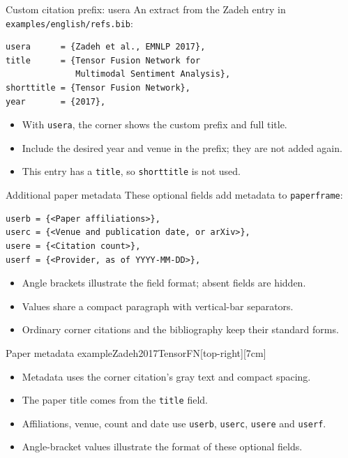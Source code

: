\begin{frame}[fragile]{Custom citation prefix: usera}
  An extract from the Zadeh entry in \texttt{examples/english/refs.bib}:
  \begin{verbatim}
usera      = {Zadeh et al., EMNLP 2017},
title      = {Tensor Fusion Network for
              Multimodal Sentiment Analysis},
shorttitle = {Tensor Fusion Network},
year       = {2017},
  \end{verbatim}
  \begin{itemize}
    \item With \texttt{usera}, the corner shows the custom prefix and full title.
    \item Include the desired year and venue in the prefix; they are not added again.
    \item This entry has a \texttt{title}, so \texttt{shorttitle} is not used.
  \end{itemize}
\end{frame}

\begin{frame}[fragile]{Additional paper metadata}
  These optional fields add metadata to \texttt{paperframe}:
  \begin{verbatim}
userb = {<Paper affiliations>},
userc = {<Venue and publication date, or arXiv>},
usere = {<Citation count>},
userf = {<Provider, as of YYYY-MM-DD>},
  \end{verbatim}
  \begin{itemize}
    \item Angle brackets illustrate the field format; absent fields are hidden.
    \item Values share a compact paragraph with vertical-bar separators.
    \item Ordinary corner citations and the bibliography keep their standard forms.
  \end{itemize}
\end{frame}

\begin{paperframe}{Paper metadata example}{Zadeh2017TensorFN}[top-right][7cm]
  \begin{itemize}
    \item Metadata uses the corner citation's gray text and compact spacing.
    \item The paper title comes from the \texttt{title} field.
    \item Affiliations, venue, count and date use \texttt{userb}, \texttt{userc}, \texttt{usere} and \texttt{userf}.
    \item Angle-bracket values illustrate the format of these optional fields.
  \end{itemize}
\end{paperframe}

